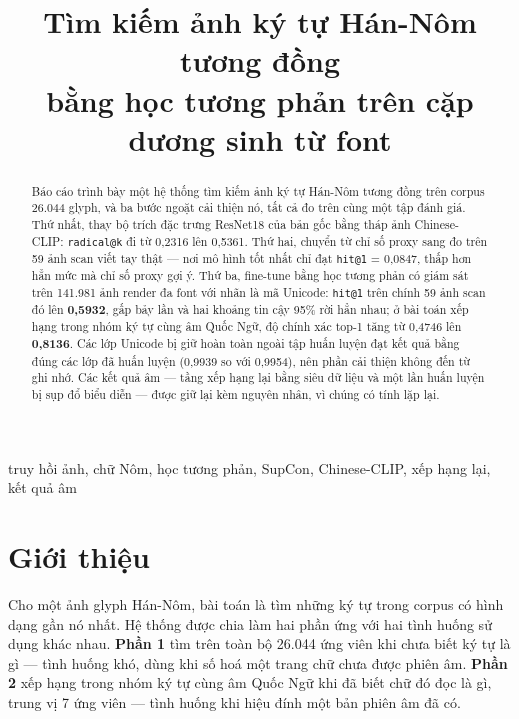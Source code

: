 \documentclass[conference,a4paper]{IEEEtran}
\newcommand{\code}[1]{{\small\texttt{#1}}}
\begin{document}
\title{Tìm kiếm ảnh ký tự Hán-Nôm tương đồng\\
bằng học tương phản trên cặp dương sinh từ font}

\author{
}

\maketitle

\begin{abstract}
Báo cáo trình bày một hệ thống tìm kiếm ảnh ký tự Hán-Nôm tương đồng trên corpus 26.044 glyph, và
ba bước ngoặt cải thiện nó, tất cả đo trên cùng một tập đánh giá. Thứ nhất, thay bộ trích đặc trưng
ResNet18 của bản gốc bằng tháp ảnh Chinese-CLIP: \code{radical@k} đi từ 0,2316 lên 0,5361. Thứ hai,
chuyển từ chỉ số proxy sang đo trên 59 ảnh scan viết tay thật --- nơi mô hình tốt nhất chỉ đạt
\code{hit@1} = 0,0847, thấp hơn hẳn mức mà chỉ số proxy gợi ý. Thứ ba, fine-tune bằng học tương phản
có giám sát trên 141.981 ảnh render đa font với nhãn là mã Unicode: \code{hit@1} trên chính 59 ảnh
scan đó lên \textbf{0,5932}, gấp bảy lần và hai khoảng tin cậy 95\% rời hẳn nhau; ở bài toán xếp
hạng trong nhóm ký tự cùng âm Quốc Ngữ, độ chính xác top-1 tăng từ 0,4746 lên \textbf{0,8136}. Các
lớp Unicode bị giữ hoàn toàn ngoài tập huấn luyện đạt kết quả bằng đúng các lớp đã huấn luyện
(0,9939 so với 0,9954), nên phần cải thiện không đến từ ghi nhớ. Các kết quả âm --- tầng xếp hạng
lại bằng siêu dữ liệu và một lần huấn luyện bị sụp đổ biểu diễn --- được giữ lại kèm nguyên nhân,
vì chúng có tính lặp lại.
\end{abstract}

\begin{IEEEkeywords}
truy hồi ảnh, chữ Nôm, học tương phản, SupCon, Chinese-CLIP, xếp hạng lại, kết quả âm
\end{IEEEkeywords}

\section{Giới thiệu}

Cho một ảnh glyph Hán-Nôm, bài toán là tìm những ký tự trong corpus có hình dạng gần nó nhất. Hệ
thống được chia làm hai phần ứng với hai tình huống sử dụng khác nhau. \textbf{Phần 1} tìm trên toàn
bộ 26.044 ứng viên khi chưa biết ký tự là gì --- tình huống khó, dùng khi số hoá một trang chữ chưa
được phiên âm. \textbf{Phần 2} xếp hạng trong nhóm ký tự cùng âm Quốc Ngữ khi đã biết chữ đó đọc là
gì, trung vị 7 ứng viên --- tình huống khi hiệu đính một bản phiên âm đã có.
\end{document}
